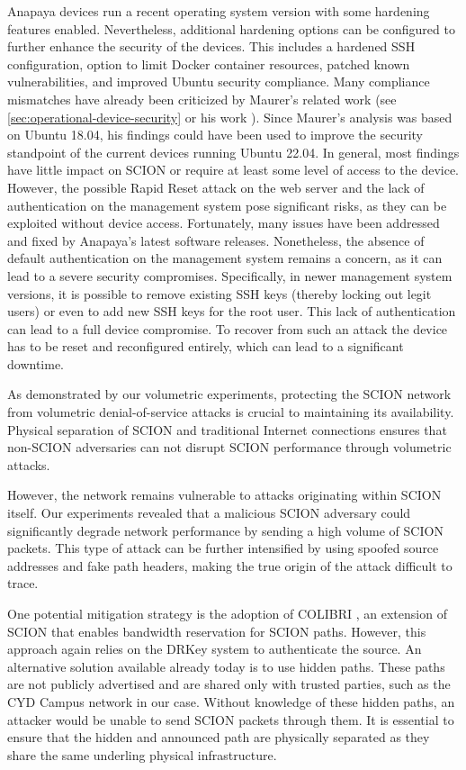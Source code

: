 Anapaya devices run a recent operating system version with some hardening features enabled.
Nevertheless, additional hardening options can be configured to further enhance the security of the devices.
This includes a hardened SSH configuration, option to limit Docker container resources, patched known vulnerabilities, and improved Ubuntu security compliance.
Many compliance mismatches have already been criticized by Maurer's related work (see \cref{sec:operational-device-security} or his work \cite{Maurer2021}).
Since Maurer's analysis was based on Ubuntu 18.04, his findings could have been used to improve the security standpoint of the current devices running Ubuntu 22.04.
In general, most findings have little impact on SCION or require at least some level of access to the device.
However, the possible Rapid Reset attack on the web server and the lack of authentication on the management system pose significant risks, as they can be exploited without device access.
Fortunately, many issues have been addressed and fixed by Anapaya's latest software releases.
Nonetheless, the absence of default authentication on the management system remains a concern, as it can lead to a severe security compromises.
Specifically, in newer management system versions, it is possible to remove existing SSH keys (thereby locking out legit users) or even to add new SSH keys for the root user.
This lack of authentication can lead to a full device compromise.
To recover from such an attack the device has to be reset and reconfigured entirely, which can lead to a significant downtime.

As demonstrated by our volumetric experiments, protecting the SCION network from volumetric denial-of-service attacks is crucial to maintaining its availability.
Physical separation of SCION and traditional Internet connections ensures that non-SCION adversaries can not disrupt SCION performance through volumetric attacks.

However, the network remains vulnerable to attacks originating within SCION itself.
Our experiments revealed that a malicious SCION adversary could significantly degrade network performance by sending a high volume of SCION packets.
This type of attack can be further intensified by using spoofed source addresses and fake path headers, making the true origin of the attack difficult to trace.

One potential mitigation strategy is the adoption of COLIBRI \cite[Section 10.2]{Perrig2022}, an extension of SCION that enables bandwidth reservation for SCION paths.
However, this approach again relies on the DRKey system to authenticate the source.
An alternative solution available already today is to use hidden paths.
These paths are not publicly advertised and are shared only with trusted parties, such as the CYD Campus network in our case.
Without knowledge of these hidden paths, an attacker would be unable to send SCION packets through them.
It is essential to ensure that the hidden and announced path are physically separated as they share the same underling physical infrastructure.

